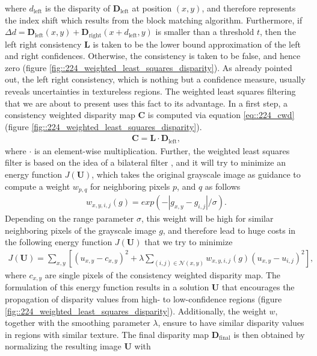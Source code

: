 where $d_\text{left}$ is the disparity of $\bm{D}_\text{left}$ at position $(x,y)$, and therefore represents the index shift which results from the block matching algorithm. Furthermore, if $\Delta d = \bm{D}_\text{left}(x, y) + \bm{D}_\text{right}(x + d_\text{left}, y)$ is smaller than a threshold $t$, then the left right consistency $\bm{L}$ is taken to be the lower bound approximation of the left and right confidences. Otherwise, the consistency is taken to be false, and hence zero (figure \ref{fig::224_weighted_least_squares_disparity}). As already pointed out, the left right consistency, which is nothing but a confidence measure, usually reveals uncertainties in textureless regions. The weighted least squares filtering that we are about to present uses this fact to its advantage. In a first step, a consistency weighted disparity map $\bm{C}$ is computed via equation \ref{eq::224_cwd} (figure \ref{fig::224_weighted_least_squares_disparity}).
\begin{align}
	\bm{C}=\bm{L}\cdot\bm{D}_\text{left},
	\label{eq::224_cwd}
\end{align}
where $\cdot$ is an element-wise multiplication. Further, the weighted least squares filter is based on the idea of a bilateral filter \cite{tomasi1998bilateral}, and it will try to minimize an energy function $J(\bm{U})$, which takes the original grayscale image as guidance to compute a weight $w_{p,q}$ for neighboring pixels $p$, and $q$ as follows
\begin{align}
	w_{x,y,i,j}(g) = exp(-|g_{x,y}-g_{i,j}|/\sigma).
	\label{eq::224_weight}
\end{align}
Depending on the range parameter $\sigma$, this weight will be high for similar neighboring pixels of the grayscale image $g$, and therefore lead to huge costs in the following energy function $J(\bm{U})$ that we try to minimize
\begin{align}
	J(\bm{U}) = \sum_{x,y}\left[(u_{x,y}-c_{x,y})^2+\lambda\sum_{(i,j)\in\mathcal{N}(x,y)}w_{x,y,i,j}(g)(u_{x,y}-u_{i,j})^2\right],
	\label{eq::224_energy_function}
\end{align}
where $c_{x,y}$ are single pixels of the consistency weighted disparity map. The formulation of this energy function results in a solution $\bm{U}$ that encourages the propagation of disparity values from high- to low-confidence regions (figure \ref{fig::224_weighted_least_squares_disparity}). Additionally, the weight $w$, together with the smoothing parameter $\lambda$, ensure to have similar disparity values in regions with similar texture. The final disparity map $\bm{D}_\text{final}$ is then obtained by normalizing the resulting image $\bm{U}$ with
